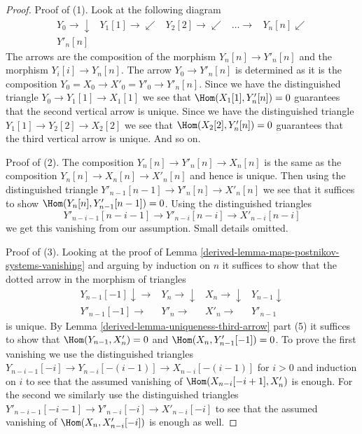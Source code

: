 \begin{proof}

Proof of (1). Look at the following diagram
$$
\begin{array}{ccccc}Y_0 \longrightarrow\downarrow & Y_1[1] \longrightarrow\swarrow & Y_2[2] \longrightarrow\swarrow & \ldots \longrightarrow & Y_n[n] \swarrow \\ Y'_n[n] &  &  &  & \end{array}
$$
The arrows are the composition of the morphism $Y_n[n] \to Y'_n[n]$
and the morphism $Y_i[i] \to Y_n[n]$. The arrow $Y_0 \to Y'_n[n]$
is determined as it is the composition $Y_0 = X_0 \to X'_0 = Y'_0 \to Y'_n[n]$.
Since we have the distinguished triangle $Y_0 \to Y_1[1] \to X_1[1]$
we see that $\Hom(X_1[1], Y'_n[n]) = 0$ guarantees that the second vertical
arrow is unique. Since we have the distinguished triangle
$Y_1[1] \to Y_2[2] \to X_2[2]$ we see that $\Hom(X_2[2], Y'_n[n]) = 0$
guarantees that the third vertical arrow is unique. And so on.

\medskip\noindent
Proof of (2). The composition $Y_n[n] \to Y'_n[n] \to X_n[n]$ is
the same as the composition $Y_n[n] \to X_n[n] \to X'_n[n]$ and hence
is unique. Then using the distinguished triangle
$Y'_{n - 1}[n - 1] \to Y'_n[n] \to X'_n[n]$ we see that it suffices
to show $\Hom(Y_n[n], Y'_{n - 1}[n - 1]) = 0$. Using the distinguished
triangles
$$
Y'_{n - i - 1}[n - i - 1] \to Y'_{n - i}[n - i] \to X'_{n - i}[n - i]
$$
we get this vanishing from our assumption. Small details omitted.

\medskip\noindent
Proof of (3). Looking at the proof of
Lemma \ref{derived-lemma-maps-postnikov-systems-vanishing}
and arguing by induction on $n$ it suffices to show that the dotted arrow
in the morphism of triangles
$$
\begin{array}{cccc}Y_{n - 1}[-1] \downarrow\longrightarrow & Y_n \longrightarrow\downarrow & X_n \longrightarrow\downarrow & Y_{n - 1} \downarrow \\ Y'_{n - 1}[-1] \longrightarrow & Y'_n \longrightarrow & X'_n \longrightarrow & Y'_{n - 1}\end{array}
$$
is unique. By Lemma \ref{derived-lemma-uniqueness-third-arrow} part (5)
it suffices to show that $\Hom(Y_{n - 1}, X'_n) = 0$ and
$\Hom(X_n, Y'_{n - 1}[-1]) = 0$.
To prove the first vanishing we use the distinguished triangles
$Y_{n - i - 1}[-i] \to Y_{n - i}[-(i - 1)] \to X_{n - i}[-(i - 1)]$
for $i > 0$ and induction on $i$ to see that the assumed
vanishing of $\Hom(X_{n - i}[-i + 1], X'_n)$ is enough.
For the second we similarly use the distinguished triangles
$Y'_{n - i - 1}[-i - 1] \to Y'_{n - i}[-i] \to X'_{n - i}[-i]$
to see that the assumed vanishing of
$\Hom(X_n, X'_{n - i}[-i])$ is enough as well.
\end{proof}

